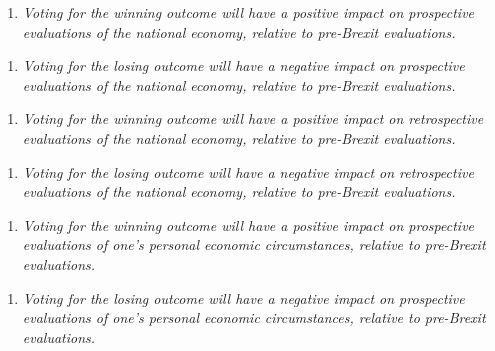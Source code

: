 \documentclass[12pt, letter]{article}
\begin{document}
\vspace{12pt}
\begin{enumerate}[label= \textbf{Hypothesis 3a (H3a)},  leftmargin=*]
  \item \textit{Voting for the winning outcome will have a positive impact on prospective evaluations of the national economy, relative to pre-Brexit evaluations.}
\end{enumerate}

\begin{enumerate}[label= \textbf{Hypothesis 3b (H3b)},  leftmargin=*]
  \item \textit{Voting for the losing outcome will have a negative impact on prospective evaluations of the national economy, relative to pre-Brexit evaluations.}
\end{enumerate}

\begin{enumerate}[label= \textbf{Hypothesis 3c (H3c)},  leftmargin=*]
  \item \textit{Voting for the winning outcome will have a positive impact on retrospective evaluations of the national economy, relative to pre-Brexit evaluations.}
\end{enumerate}

\begin{enumerate}[label= \textbf{Hypothesis 3d (H3d)},  leftmargin=*]
  \item \textit{Voting for the losing outcome will have a negative impact on retrospective evaluations of the national economy, relative to pre-Brexit evaluations.}
\end{enumerate}

\begin{enumerate}[label= \textbf{Hypothesis 3e (H3e)},  leftmargin=*]
  \item \textit{Voting for the winning outcome will have a positive impact on prospective evaluations of one's personal economic circumstances, relative to pre-Brexit evaluations.}
\end{enumerate}

\begin{enumerate}[label= \textbf{Hypothesis 3f (H3f)},  leftmargin=*]
  \item \textit{Voting for the losing outcome will have a negative impact on prospective evaluations of one's personal economic circumstances, relative to pre-Brexit evaluations.}
\end{enumerate}

\end{document}
